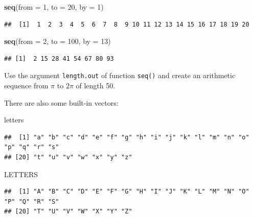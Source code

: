 \documentclass[
]{book}
\makeatletter
\newenvironment{Shaded}{\begin{snugshade}}{\end{snugshade}}
\newcommand{\DataTypeTok}[1]{\textcolor[rgb]{0.13,0.29,0.53}{#1}}
\newcommand{\DecValTok}[1]{\textcolor[rgb]{0.00,0.00,0.81}{#1}}
\newcommand{\KeywordTok}[1]{\textcolor[rgb]{0.13,0.29,0.53}{\textbf{#1}}}
\newcommand{\NormalTok}[1]{#1}
\newenvironment{kframe}{%
\medskip{}
\setlength{\fboxsep}{.8em}
 \def\at@end@of@kframe{}%
 \ifinner\ifhmode%
  \def\at@end@of@kframe{\end{minipage}}%
  \begin{minipage}{\columnwidth}%
 \fi\fi%
 \def\FrameCommand##1{\hskip\@totalleftmargin \hskip-\fboxsep
 \colorbox{shadecolor}{##1}\hskip-\fboxsep
     \hskip-\linewidth \hskip-\@totalleftmargin \hskip\columnwidth}%
 \MakeFramed {\advance\hsize-\width
   \@totalleftmargin\z@ \linewidth\hsize
   \@setminipage}}%
 {\par\unskip\endMakeFramed%
 \at@end@of@kframe}
\newenvironment{rmdblock}[1]
  {
  \begin{itemize}
  \renewcommand{\labelitemi}{
    \raisebox{-.7\height}[0pt][0pt]{
      {\setkeys{Gin}{width=3em,keepaspectratio}\texttt{[image: images/\#1]}}
    }
  }
  \setlength{\fboxsep}{1em}
  \begin{kframe}
  \item
  }
  {
  \end{kframe}
  \end{itemize}
  }
\newenvironment{rmdtask}
  {\begin{rmdblock}{task}}
  {\end{rmdblock}}
\makeatother
\begin{document}
\begin{Shaded}
\begin{Highlighting}[]
\KeywordTok{seq}\NormalTok{(}\DataTypeTok{from =} \DecValTok{1}\NormalTok{, }\DataTypeTok{to =} \DecValTok{20}\NormalTok{, }\DataTypeTok{by =} \DecValTok{1}\NormalTok{)}
\end{Highlighting}
\end{Shaded}

\begin{verbatim}
##  [1]  1  2  3  4  5  6  7  8  9 10 11 12 13 14 15 16 17 18 19 20
\end{verbatim}

\begin{Shaded}
\begin{Highlighting}[]
\KeywordTok{seq}\NormalTok{(}\DataTypeTok{from =} \DecValTok{2}\NormalTok{, }\DataTypeTok{to =} \DecValTok{100}\NormalTok{, }\DataTypeTok{by =} \DecValTok{13}\NormalTok{)}
\end{Highlighting}
\end{Shaded}

\begin{verbatim}
## [1]  2 15 28 41 54 67 80 93
\end{verbatim}

\begin{rmdtask}
Use the argument \texttt{length.out} of function \texttt{seq()} and
create an arithmetic sequence from \(\pi\) to \(2\pi\) of length 50.
\end{rmdtask}

There are also some built-in vectors:

\begin{Shaded}
\begin{Highlighting}[]
\NormalTok{letters}
\end{Highlighting}
\end{Shaded}

\begin{verbatim}
##  [1] "a" "b" "c" "d" "e" "f" "g" "h" "i" "j" "k" "l" "m" "n" "o" "p" "q" "r" "s"
## [20] "t" "u" "v" "w" "x" "y" "z"
\end{verbatim}

\begin{Shaded}
\begin{Highlighting}[]
\NormalTok{LETTERS}
\end{Highlighting}
\end{Shaded}

\begin{verbatim}
##  [1] "A" "B" "C" "D" "E" "F" "G" "H" "I" "J" "K" "L" "M" "N" "O" "P" "Q" "R" "S"
## [20] "T" "U" "V" "W" "X" "Y" "Z"
\end{verbatim}
\end{document}
